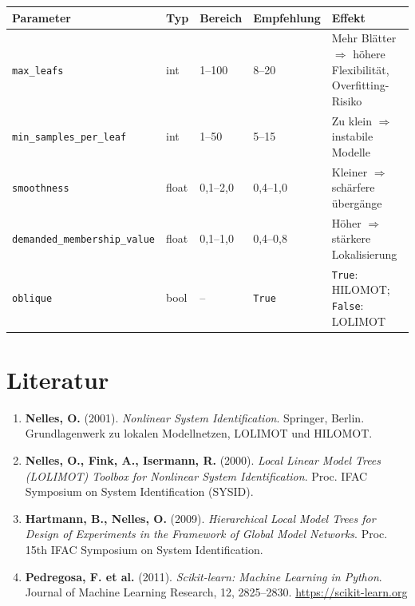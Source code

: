 \documentclass[11pt,a4paper]{report}
\begin{document}
	\begin{center}
		\begin{tabular}{p{4cm}p{1.2cm}p{2.2cm}p{2cm}p{4.5cm}}
			\toprule
			\textbf{Parameter} & \textbf{Typ} & \textbf{Bereich} & \textbf{Empfehlung} & \textbf{Effekt} \\
			\midrule
			\texttt{max\_leafs} & int & 1--100 & 8--20 & Mehr Blätter $\Rightarrow$ höhere Flexibilität, Overfitting-Risiko \\
			\texttt{min\_samples\_per\_leaf} & int & 1--50 & 5--15 & Zu klein $\Rightarrow$ instabile Modelle \\
			\texttt{smoothness} & float & 0{,}1--2{,}0 & 0{,}4--1{,}0 & Kleiner $\Rightarrow$ schärfere übergänge \\
			\texttt{demanded\_membership\_value} & float & 0{,}1--1{,}0 & 0{,}4--0{,}8 & Höher $\Rightarrow$ stärkere Lokalisierung \\
			\texttt{oblique} & bool & -- & \texttt{True} & \texttt{True}: HILOMOT; \texttt{False}: LOLIMOT \\
			\bottomrule
		\end{tabular}
	\end{center}
	
	\section{Literatur}
	
	\begin{enumerate}
		\item \textbf{Nelles, O.} (2001). \textit{Nonlinear System Identification}. Springer, Berlin.\\
		Grundlagenwerk zu lokalen Modellnetzen, LOLIMOT und HILOMOT.
		
		\item \textbf{Nelles, O., Fink, A., Isermann, R.} (2000). \textit{Local Linear Model Trees (LOLIMOT) Toolbox for Nonlinear System Identification}. Proc. IFAC Symposium on System Identification (SYSID).
		
		\item \textbf{Hartmann, B., Nelles, O.} (2009). \textit{Hierarchical Local Model Trees for Design of Experiments in the Framework of Global Model Networks}. Proc. 15th IFAC Symposium on System Identification.
		
		\item \textbf{Pedregosa, F. et al.} (2011). \textit{Scikit-learn: Machine Learning in Python}. Journal of Machine Learning Research, 12, 2825--2830. \url{https://scikit-learn.org}
	\end{enumerate}
	
\end{document}
